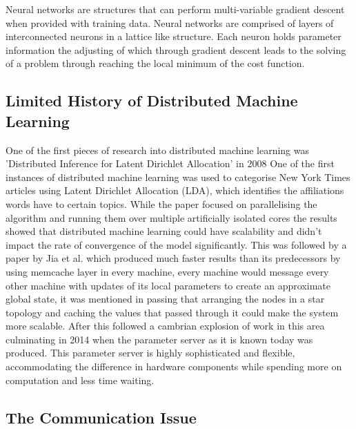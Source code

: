 Neural networks are structures that can perform multi-variable gradient descent
when provided with training data. Neural networks are comprised of layers of
interconnected neurons in a lattice like structure. Each neuron holds parameter
information the adjusting of which through gradient descent leads to the solving
of a problem through reaching the local minimum of the cost function.

\subsection{Limited History of Distributed Machine Learning}

One of the first pieces of research into distributed machine learning was
’Distributed Inference for Latent Dirichlet Allocation’ in 2008
\cite{newman2008distributed} One of the first instances of distributed machine
learning  was  used  to  categorise  New York  Times  articles  using  Latent
Dirichlet Allocation (LDA), which identifies the affiliations words have to
certain topics.  While the paper focused on parallelising the algorithm and
running them over multiple artificially isolated cores the results showed that
distributed machine learning could have scalability and didn’t impact the rate
of convergence of the model significantly. This was followed by a paper by Jia
et al. \cite{ParallelTopicModels} which produced much faster results than its
predecessors by using memcache layer in every machine, every machine would
message every other machine with updates of its local parameters to create an
approximate global state, it was mentioned in passing that arranging the nodes
in a star topology and caching the values that passed through it could make the
system more scalable. After this followed a cambrian explosion of work in this
area \cite{Ahmed2012YahooLDA, li2014communication, Dean2012Distbelief,
googlemapreduce2008} culminating in 2014 when the parameter server as it is
known today \cite{LI2014ParameterServers} was produced. This parameter server is
highly sophisticated and flexible, accommodating the difference in hardware
components while spending more on computation and less time waiting.

\subsection{The Communication Issue}

